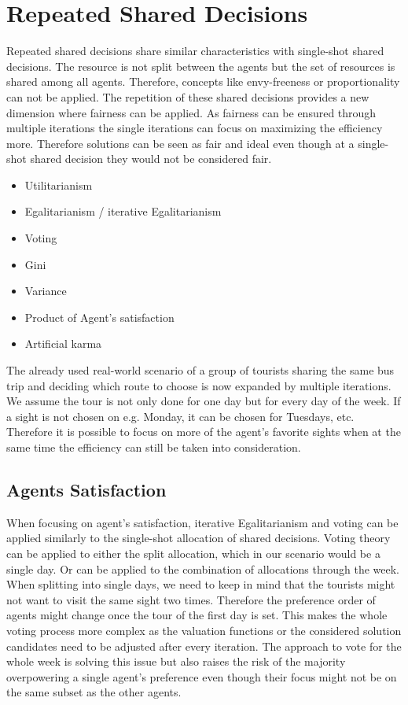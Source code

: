 \documentclass[german, a4paper, 11pt, oneside]{scrbook}
\begin{document}
\section{Repeated Shared Decisions}
Repeated shared decisions share similar characteristics with single-shot shared decisions. The resource is not split between the agents but the set of resources is shared among all agents. Therefore, concepts like envy-freeness or proportionality can not be applied. The repetition of these shared decisions provides a new dimension where fairness can be applied. As fairness can be ensured through multiple iterations the single iterations can focus on maximizing the efficiency more. Therefore solutions can be seen as fair and ideal even though at a single-shot shared decision they would not be considered fair. 
\begin{itemize}
  \item Utilitarianism
  \item Egalitarianism / iterative Egalitarianism
  \item Voting
\item Gini 
\item Variance
\item Product of Agent's satisfaction
\item Artificial karma
\end{itemize}
The already used real-world scenario of a group of tourists sharing the same bus trip and deciding which route to choose is now expanded by multiple iterations. We assume the tour is not only done for one day but for every day of the week. If a sight is not chosen on e.g. Monday, it can be chosen for Tuesdays, etc. Therefore it is possible to focus on more of the agent's favorite sights when at the same time the efficiency can still be taken into consideration.
\subsection{Agents Satisfaction}
When focusing on agent's satisfaction, iterative Egalitarianism and voting can be applied similarly to the single-shot allocation of shared decisions. Voting theory can be applied to either the split allocation, which in our scenario would be a single day. Or can be applied to the combination of allocations through the week. When splitting into single days, we need to keep in mind that the tourists might not want to visit the same sight two times. Therefore the preference order of agents might change once the tour of the first day is set. This makes the whole voting process more complex as the valuation functions or the considered solution candidates need to be adjusted after every iteration. The approach to vote for the whole week is solving this issue but also raises the risk of the majority overpowering a single agent's preference even though their focus might not be on the same subset as the other agents.
\end{document}
